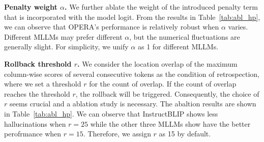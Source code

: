 \documentclass[10pt,twocolumn,letterpaper]{article}
\newcommand{\Tref}[1]{Table~\ref{#1}}
\begin{document}
\noindent\textbf{Penalty weight $\alpha$.} 
We further ablate the weight of the introduced penalty term that is incorporated with the model logit. 
From the results in \Tref{tab:abl_hp}, we can observe that OPERA's performance is relatively robust when $\alpha$ varies. 
Different MLLMs may prefer different $\alpha$, but the numerical fluctuations are generally slight. 
For simplicity, we unify $\alpha$ as 1 for different MLLMs.


\noindent\textbf{Rollback threshold $r$.} 
We consider the location overlap of the maximum column-wise scores of several consecutive tokens as the condition of retrospection, where we set a threshold $r$ for the count of overlap. 
If the count of overlap reaches the threshold $r$, the rollback will be triggered. 
Consequently, the choice of $r$ seems crucial and a ablation study is necessary. 
The abaltion results are shown in \Tref{tab:abl_hp}. 
We can observe that InstructBLIP shows less hallucinations when $r=25$ while the other three MLLMs show have the better perofrmance when $r=15$. 
Therefore, we assign $r$ as 15 by default.
\end{document}
